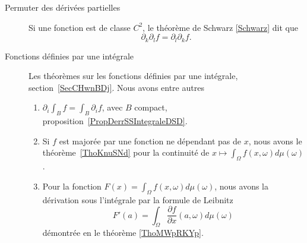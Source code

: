 
        \label{THEMEooJGEHooNzQkMT}
\begin{description}
	\item[Permuter des dérivées partielles]
	      Si une fonction est de classe \( C^2\), le théorème de Schwarz \ref{Schwarz} dit que
	      \begin{equation}
		      \partial_k\partial_lf=\partial_l\partial_kf.
	      \end{equation}
	\item[Fonctions définies par une intégrale]
	      Les théorèmes sur les fonctions définies par une intégrale, section~\ref{SecCHwnBDj}. Nous avons entre autres
	      \begin{enumerate}
		      \item
		            \( \partial_i\int_Bf=\int_B\partial_if\), avec \( B\) compact, proposition~\ref{PropDerrSSIntegraleDSD}.
		      \item
		            Si \( f\) est majorée par une fonction ne dépendant pas de \( x\), nous avons le théorème~\ref{ThoKnuSNd} pour la continuité de \( x\mapsto \int_{\Omega}f(x,\omega)d\mu(\omega)\).
		      \item
		            Pour la fonction \( F(x)=\int_{\Omega}f(x,\omega)d\mu(\omega)\), nous avons la dérivation sous l'intégrale par la formule de Leibnitz
		            \begin{equation}
			            F'(a)=\int_{\Omega}\frac{ \partial f }{ \partial x }(a,\omega)d\mu(\omega)
		            \end{equation}
		            démontrée en le théorème \ref{ThoMWpRKYp}.


\end{enumerate}
\end{description}
